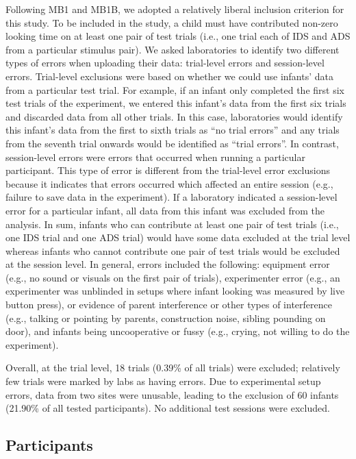 \documentclass[
  english,
  ,man,floatsintext]{apa6}
\begin{document}
Following MB1 and MB1B, we adopted a relatively liberal inclusion criterion for this study. To be included in the study, a child must have contributed non-zero looking time on at least one pair of test trials (i.e., one trial each of IDS and ADS from a particular stimulus pair). We asked laboratories to identify two different types of errors when uploading their data: trial-level errors and session-level errors. Trial-level exclusions were based on whether we could use infants' data from a particular test trial. For example, if an infant only completed the first six test trials of the experiment, we entered this infant's data from the first six trials and discarded data from all other trials. In this case, laboratories would identify this infant's data from the first to sixth trials as ``no trial errors'' and any trials from the seventh trial onwards would be identified as ``trial errors''. In contrast, session-level errors were errors that occurred when running a particular participant. This type of error is different from the trial-level error exclusions because it indicates that errors occurred which affected an entire session (e.g., failure to save data in the experiment). If a laboratory indicated a session-level error for a particular infant, all data from this infant was excluded from the analysis. In sum, infants who can contribute at least one pair of test trials (i.e., one IDS trial and one ADS trial) would have some data excluded at the trial level whereas infants who cannot contribute one pair of test trials would be excluded at the session level. In general, errors included the following: equipment error (e.g., no sound or visuals on the first pair of trials), experimenter error (e.g., an experimenter was unblinded in setups where infant looking was measured by live button press), or evidence of parent interference or other types of interference (e.g., talking or pointing by parents, construction noise, sibling pounding on door), and infants being uncooperative or fussy (e.g., crying, not willing to do the experiment).

Overall, at the trial level, 18 trials (0.39\% of all trials) were excluded; relatively few trials were marked by labs as having errors. Due to experimental setup errors, data from two sites were unusable, leading to the exclusion of 60 infants (21.90\% of all tested participants). No additional test sessions were excluded.

\subsection{Participants}\label{participants}
\end{document}
